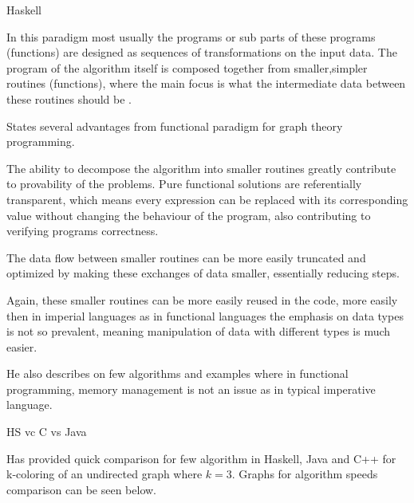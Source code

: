 Haskell

In this paradigm most usually the programs or sub parts of these programs (functions) are designed as sequences of transformations on the input data. The program of the algorithm itself is composed together from smaller,simpler routines (functions), where the main focus is what the intermediate data between these routines should be \parencite{king1996functional}.

\textcite{king1996functional} States several advantages from functional paradigm for graph theory programming.

The ability to decompose the algorithm into smaller routines greatly contribute to provability of the problems. Pure functional solutions are referentially transparent, which means every expression can be replaced with its corresponding value without changing the behaviour of the program, also contributing to verifying programs correctness. 

The data flow between smaller routines can be more easily truncated and optimized by making these exchanges of data smaller, essentially reducing steps. 

Again, these smaller routines can be more easily reused in the code, more easily then in imperial languages as in functional languages the emphasis on data types is not so prevalent, meaning manipulation of data with different types is much easier.

He also describes on few algorithms and examples where in functional programming, memory management is not an issue as in typical imperative language.

HS vc C vs Java

\textcite{fender_2011} Has provided quick comparison for few algorithm in Haskell, Java and C++ for k-coloring of an undirected graph where $k=3$. Graphs for algorithm speeds comparison can be seen below.
 
